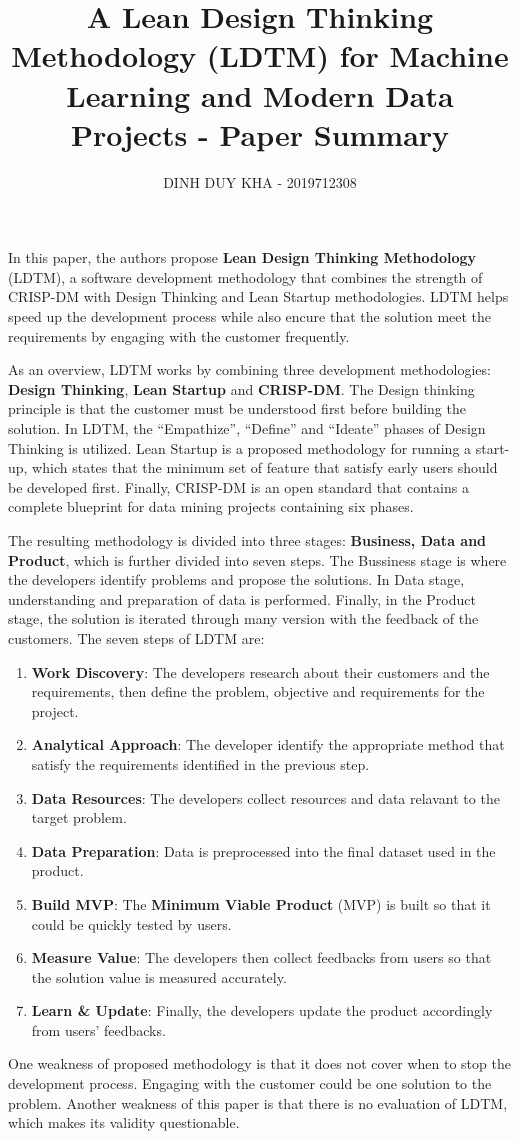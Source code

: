\documentclass[11pt]{article}
\author{DINH DUY KHA - 2019712308}
\date{}
\title{A Lean Design Thinking Methodology (LDTM) for Machine Learning and  Modern Data Projects - Paper Summary}
\begin{document}
\maketitle
\tableofcontents

In this paper, the authors propose \textbf{Lean Design Thinking Methodology} (LDTM), a software development methodology that combines the strength of CRISP-DM with Design Thinking and Lean Startup methodologies. LDTM helps speed up the development process while also encure that the solution meet the requirements by engaging with the customer frequently.

As an overview, LDTM works by combining three development methodologies: \textbf{Design Thinking}, \textbf{Lean Startup} and \textbf{CRISP-DM}.  The Design thinking principle is that the customer must be understood first before building the solution. In LDTM,  the ``Empathize'', ``Define'' and ``Ideate'' phases of Design Thinking is utilized. Lean Startup is a proposed methodology for running a start-up, which states that the minimum set of feature that satisfy early users should be developed first. Finally, CRISP-DM is an open standard that contains a complete blueprint for data mining projects containing six phases.

The resulting methodology is divided into three stages: \textbf{Business, Data and Product}, which is further divided into seven steps. The Bussiness stage is where the developers identify problems and propose the solutions. In Data stage, understanding and preparation of data is performed. Finally, in the Product stage, the solution is iterated through many version with the feedback of the customers.
The seven steps of LDTM are:
\begin{enumerate}
\item \textbf{Work Discovery}: The developers research about their customers and the requirements, then define the problem, objective and requirements for the project.
\item \textbf{Analytical Approach}: The developer identify the appropriate method that satisfy the requirements identified in the previous step.
\item \textbf{Data Resources}: The developers collect resources and data relavant to the target problem.
\item \textbf{Data Preparation}: Data is preprocessed into the final dataset used in the product.
\item \textbf{Build MVP}: The \textbf{Minimum Viable Product} (MVP) is built so that it could be quickly tested by users.
\item \textbf{Measure Value}: The developers then collect feedbacks from users so that the solution value is measured accurately.
\item \textbf{Learn \& Update}: Finally, the developers update the product accordingly from users' feedbacks.
\end{enumerate}



One weakness of proposed methodology is that it does not cover when to stop the development process. Engaging with the customer could be one solution to the problem. Another weakness of this paper is that there is no evaluation of LDTM, which makes its validity questionable.
\end{document}

